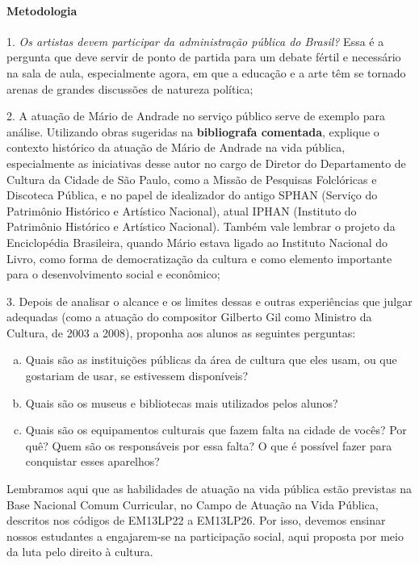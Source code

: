 \documentclass[11pt]{extarticle}
\begin{document}
\paragraph{Metodologia}

1. \textit{Os artistas devem participar da administração pública do Brasil?} Essa
é a pergunta que deve servir de ponto de partida para um debate fértil e
necessário na sala de aula, especialmente agora, em que a educação e a
arte têm se tornado arenas de grandes discussões de natureza política;

2. A atuação de Mário de Andrade no serviço público serve de exemplo
para análise. Utilizando obras sugeridas na \textbf{bibliografa
comentada}, explique o contexto histórico da atuação de Mário de Andrade
na vida pública, especialmente as iniciativas desse autor no cargo de
Diretor do Departamento de Cultura da Cidade de São Paulo, como a Missão
de Pesquisas Folclóricas e Discoteca Pública, e no papel de idealizador
do antigo SPHAN (Serviço do Patrimônio Histórico e Artístico Nacional),
atual IPHAN (Instituto do Patrimônio Histórico e Artístico Nacional).
Também vale lembrar o projeto da Enciclopédia Brasileira, quando Mário
estava ligado ao Instituto Nacional do Livro, como forma de
democratização da cultura e como elemento importante para o
desenvolvimento social e econômico;

3. Depois de analisar o alcance e os limites dessas e outras
experiências que julgar adequadas (como a atuação do compositor Gilberto
Gil como Ministro da Cultura, de 2003 a 2008), proponha aos alunos as
seguintes perguntas:

\begin{enumerate}[(a)]  

\item Quais são as instituições públicas da área de cultura que eles usam,
ou que gostariam de usar, se estivessem disponíveis?

\item Quais são os museus e bibliotecas mais utilizados pelos alunos?

\item Quais são os equipamentos culturais que fazem falta na cidade de
vocês? Por quê? Quem são os responsáveis por essa falta? O que é
possível fazer para conquistar esses aparelhos?

\end{enumerate} 


Lembramos aqui que as habilidades de atuação na vida pública estão
previstas na Base Nacional Comum Curricular, no Campo de Atuação na Vida
Pública, descritos nos códigos de EM13LP22 a EM13LP26. Por isso, devemos
ensinar nossos estudantes a engajarem-se na participação social, aqui
proposta por meio da luta pelo direito à cultura.
\end{document}

